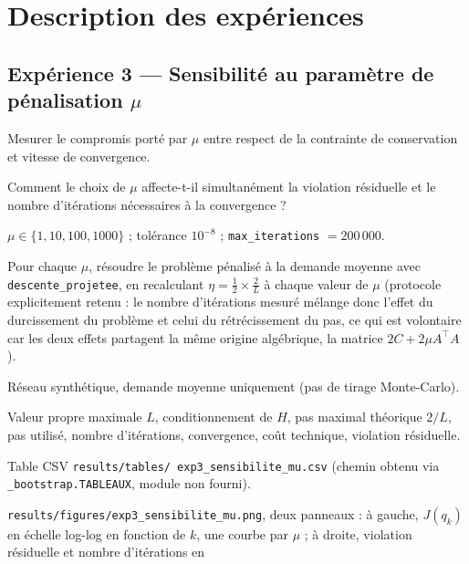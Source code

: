 \documentclass[11pt,a4paper]{article}
\begin{document}
\section{Description des expériences}

\subsection{Expérience 3 --- Sensibilité au paramètre de pénalisation
$\mu$}

\begin{description}[style=nextline]
  \item[Objectif] Mesurer le compromis porté par $\mu$ entre respect de la
  contrainte de conservation et vitesse de convergence.
  \item[Question scientifique] Comment le choix de $\mu$ affecte-t-il
  simultanément la violation résiduelle et le nombre d'itérations
  nécessaires à la convergence ?
  \item[Paramètres contrôlés] $\mu \in \{1, 10, 100, 1000\}$ ; tolérance
  $10^{-8}$ ; \texttt{max\_iterations} $= 200\,000$.
  \item[Méthode] Pour chaque $\mu$, résoudre le problème pénalisé à la
  demande moyenne avec \texttt{descente\_projetee}, en recalculant $\eta =
  \tfrac{1}{2} \times \tfrac{2}{L}$ à chaque valeur de $\mu$ (protocole
  explicitement retenu : le nombre d'itérations mesuré mélange donc l'effet
  du durcissement du problème et celui du rétrécissement du pas, ce qui est
  volontaire car les deux effets partagent la même origine algébrique, la
  matrice $2C + 2\mu A^\top A$).
  \item[Protocole expérimental] Réseau synthétique, demande moyenne
  uniquement (pas de tirage Monte-Carlo).
  \item[Métriques] Valeur propre maximale $L$, conditionnement de $H$, pas
  maximal théorique $2/L$, pas utilisé, nombre d'itérations, convergence,
  coût technique, violation résiduelle.
  \item[Sorties produites] Table CSV \texttt{results/tables/
  exp3\_sensibilite\_mu.csv} (chemin obtenu via \texttt{\_bootstrap.TABLEAUX},
  module non fourni).
  \item[Figures] \texttt{results/figures/exp3\_sensibilite\_mu.png}, deux
  panneaux : à gauche, $J(q_k)$ en échelle log-log en fonction de $k$, une
  courbe par $\mu$ ; à droite, violation résiduelle et nombre d'itérations en

\end{description}
\end{document}
